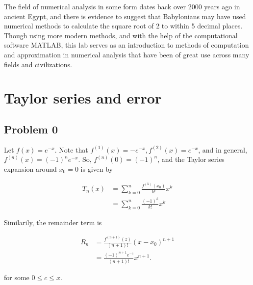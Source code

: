 \documentclass[11pt]{article}
\begin{document}
The field of numerical analysis in some form dates back over 2000 years ago in ancient Egypt, and there is evidence to suggest that Babylonians may have used numerical methods to calculate the square root of 2 to within 5 decimal places.
Though using more modern methods, and with the help of the computational software MATLAB, this lab serves as an introduction to methods of computation and approximation in numerical analysis that have been of great use across many fields and civilizations.

\section{Taylor series and error}

\setcounter{subsection}{-1}
\subsection{Problem 0}
Let $f(x) = e^{-x}$. Note that $f^{(1)}(x) = -e^{-x}, f^{(2)}(x) = e^{-x}$, and in general, $f^{(n)}(x) = (-1)^ne^{-x}$. So, $f^{(n)}(0) = (-1)^n$, and the Taylor series expansion around $x_0 = 0$ is given by

\begin{align*}
T_n(x) &= \sum_{k = 0}^n \frac{f^{(k)}(x_0)}{k!} x^k \\
&= \sum_{k = 0}^n \frac{(-1)^k}{k!}x^k
\end{align*}

Similarily, the remainder term is

\begin{align*}
R_n &= \frac{f^{(n + 1)}(z)}{(n + 1)!}(x - x_0)^{n + 1} \\
&= \frac{(-1)^{n + 1} e^{-c}}{(n + 1)!}x^{n + 1}.
\end{align*}

for some $0 \leq c \leq x$.
\end{document}
